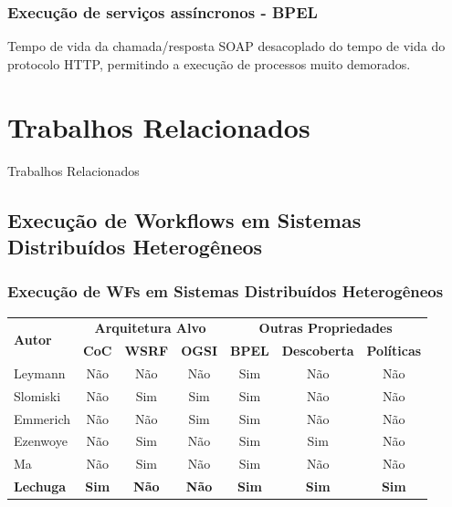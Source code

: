 \documentclass[red, cover=invisible, theme=Warsaw]{myslides}
\begin{document}
	\begin{frame}\frametitle{Execução de serviços assíncronos - BPEL}
	    Tempo de vida da chamada/resposta SOAP desacoplado do tempo de vida do protocolo HTTP, permitindo a execução de processos muito demorados.
	\end{frame}


\section{Trabalhos Relacionados}
    \begin{frame}
	\begin{center}
	{\Huge Trabalhos Relacionados}
	\end{center}
    \end{frame}
    \subsection{Execução de Workflows em Sistemas Distribuídos Heterogêneos}
	\begin{frame}\frametitle{Execução de WFs em Sistemas Distribuídos Heterogêneos}
	    \begin{table}[!htb]
		\centering
		\small
		\begin{tabular}{l||c|c|c|c|c|c} %
		    \hline
			\multirow{2}{2cm}{\textbf{Autor}} & \multicolumn{3}{c|}{\textbf{Arquitetura Alvo}} & \multicolumn{3}{c}{\textbf{Outras Propriedades}} \\
		    \cline{2-7}
			& \textbf{CoC} & \textbf{WSRF} & \textbf{OGSI} & \textbf{BPEL} & \textbf{Descoberta} & \textbf{Políticas} \\

		    \hline
		    \hline

		    Leymann  & Não & Não & Não & Sim & Não & Não \\ 
		    Slomiski & Não & Sim & Sim & Sim & Não & Não \\
		    Emmerich & Não & Não & Sim & Sim & Não & Não \\
		    Ezenwoye & Não & Sim & Não & Sim & Sim & Não \\
		    Ma 	     & Não & Sim & Não & Sim & Não & Não \\
		    \textbf{Lechuga} & \textbf{Sim} & \textbf{Não} & \textbf{Não} & \textbf{Sim} & \textbf{Sim} & \textbf{Sim} \\ 

		    \hline
		\end{tabular}
	    \end{table}
	\end{frame}
	
\end{document}

